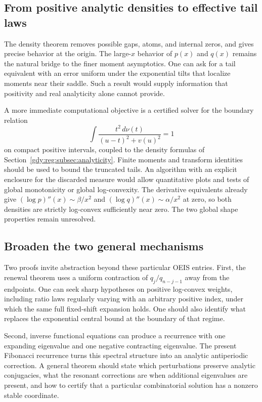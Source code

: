 \documentclass[11pt]{article}
\numberwithin{equation}{section}
\theoremstyle{definition}
\theoremstyle{remark}
\begin{document}
\subsection{From positive analytic densities to effective tail laws}

The density theorem removes possible gaps, atoms, and internal zeros,
and gives precise behavior at the origin. The large-$x$ behavior of
$p(x)$ and $q(x)$ remains the natural bridge to the finer moment
asymptotics. One can ask for a tail equivalent with an error uniform
under the exponential tilts that localize moments near their saddle.
Such a result would supply information that positivity and real
analyticity alone cannot provide.

A more immediate computational objective is a certified solver for the
boundary relation
\[
 \int\frac{t^2\,d\nu(t)}{(u-t)^2+v(u)^2}=1
\]
on compact positive intervals, coupled to the density formulas of
Section~\ref{gdy:reg:subsec:analyticity}. Finite moments and transform
identities should be used to bound the truncated tails. An algorithm
with an explicit enclosure for the discarded measure would allow
quantitative plots and tests of global monotonicity or global
log-convexity. The derivative equivalents already give
$(\log p)''(x)\sim\beta/x^2$ and
$(\log q)''(x)\sim\alpha/x^2$ at zero, so both densities are strictly
log-convex sufficiently near zero. The two global shape properties
remain unresolved.

\subsection{Broaden the two general mechanisms}

Two proofs invite abstraction beyond these particular OEIS entries.
First, the renewal theorem uses a uniform contraction of
$q_j/q_{n-j-1}$ away from the endpoints. One can seek sharp hypotheses
on positive log-convex weights, including ratio laws regularly varying
with an arbitrary positive index, under which the same full
fixed-shift expansion holds. One should also identify what replaces
the exponential central bound at the boundary of that regime.

Second, inverse functional equations can produce a recurrence with
one expanding eigenvalue and one negative contracting eigenvalue.
The present Fibonacci recurrence turns this spectral structure into
an analytic antiperiodic correction. A general theorem should state
which perturbations preserve analytic conjugacies, what the resonant
corrections are when additional eigenvalues are present, and how to
certify that a particular combinatorial solution has a nonzero
stable coordinate.
\end{document}
